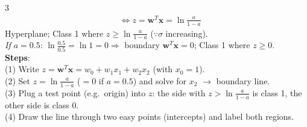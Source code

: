 \documentclass[10pt]{article}
\newcommand{\vx}{\mathbf{x}}
\newcommand{\vw}{\mathbf{w}}
\newcommand{\sub}[1]{\textit{#1}:}  %
\begin{document}
\begin{multicols*}{3}
\begin{align*}
&\iff z=\vw^T\vx=\ln\tfrac{a}{1-a}
\end{align*}
Hyperplane; Class 1 where $z\ge\ln\frac{a}{1-a}$ ($\because\sigma$ increasing).\\
\sub{If $a=0.5$} $\ln\frac{0.5}{0.5}=\ln1=0\Rightarrow$ boundary $\vw^T\vx=0$; Class 1 where $z\ge0$.\\
\textbf{Steps}:\\
(1) Write $z=\vw^T\vx=w_0+w_1x_1+w_2x_2$ (with $x_0=1$).\\
(2) Set $z=\ln\frac{a}{1-a}$ ($=0$ if $a=0.5$) and solve for $x_2$ $\to$ boundary line.\\
(3) Plug a test point (e.g.\ origin) into $z$: the side with $z>\ln\frac{a}{1-a}$ is class 1, the other side is class 0.\\
(4) Draw the line through two easy points (intercepts) and label both regions.


\end{multicols*}
\end{document}

